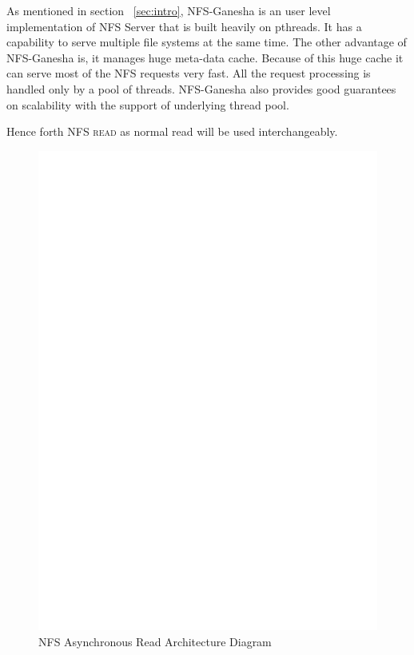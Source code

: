    As mentioned in section ~\ref{sec:intro}, NFS-Ganesha is an user level implementation of NFS Server that is built heavily on pthreads. It has a capability to serve multiple file systems at the same time. The other advantage of NFS-Ganesha is, it manages huge meta-data cache. Because of this huge cache it can serve most of the NFS requests very fast. All the request processing is handled only by a pool of threads. NFS-Ganesha also provides good guarantees on scalability with the support of underlying thread pool. 
   
  Hence forth \textsc{NFS read} as normal read will be used interchangeably.    

\begin{figure}
\centering
\includegraphics[scale=0.7]{figures/AsyncRead.eps}
\caption{NFS Asynchronous Read Architecture Diagram}
\label{fig:NFSAsyncReadArch}
\end{figure}



